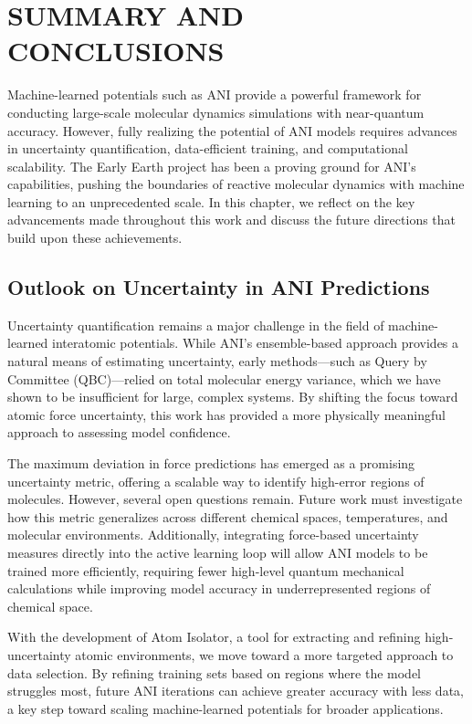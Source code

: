 \chapter{SUMMARY AND CONCLUSIONS} \label{conclusion}

Machine-learned potentials such as ANI provide a powerful framework for conducting large-scale molecular dynamics simulations with near-quantum accuracy. However, fully realizing the potential of ANI models requires advances in uncertainty quantification, data-efficient training, and computational scalability. The Early Earth project has been a proving ground for ANI’s capabilities, pushing the boundaries of reactive molecular dynamics with machine learning to an unprecedented scale. In this chapter, we reflect on the key advancements made throughout this work and discuss the future directions that build upon these achievements.

\section{Outlook on Uncertainty in ANI Predictions}

Uncertainty quantification remains a major challenge in the field of machine-learned interatomic potentials. While ANI’s ensemble-based approach provides a natural means of estimating uncertainty, early methods—such as Query by Committee (QBC)—relied on total molecular energy variance, which we have shown to be insufficient for large, complex systems. By shifting the focus toward atomic force uncertainty, this work has provided a more physically meaningful approach to assessing model confidence.

The maximum deviation in force predictions has emerged as a promising uncertainty metric, offering a scalable way to identify high-error regions of molecules. However, several open questions remain. Future work must investigate how this metric generalizes across different chemical spaces, temperatures, and molecular environments. Additionally, integrating force-based uncertainty measures directly into the active learning loop will allow ANI models to be trained more efficiently, requiring fewer high-level quantum mechanical calculations while improving model accuracy in underrepresented regions of chemical space.

With the development of Atom Isolator, a tool for extracting and refining high-uncertainty atomic environments, we move toward a more targeted approach to data selection. By refining training sets based on regions where the model struggles most, future ANI iterations can achieve greater accuracy with less data, a key step toward scaling machine-learned potentials for broader applications.

